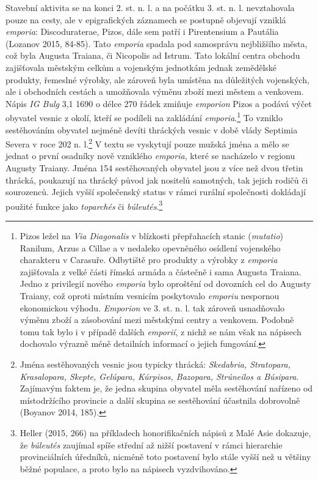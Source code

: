 Stavební aktivita se na konci 2. st. n. l. a na počátku 3. st. n. l. nevztahovala pouze na cesty, ale v epigrafických záznamech se postupně objevují vzniklá {\em emporia}: Discoduraterae, Pizos, dále sem patří i Pirentensium a Pautália (Lozanov 2015, 84-85). Tato {\em emporia} spadala pod samosprávu nejbližšího města, což byla Augusta Traiana, či Nicopolis ad Istrum. Tato lokální centra obchodu zajišťovala městským celkům a vojenským jednotkám jednak zemědělské produkty, řemeslné výrobky, ale zároveň byla umístěna na důležitých vojenských, ale i obchodních cestách a umožňovala výměnu zboží mezi městem a venkovem. Nápis {\em IG Bulg} 3,1 1690 o délce 270 řádek zmiňuje {\em emporion} Pizos a podává výčet obyvatel vesnic z okolí, kteří se podíleli na zakládání {\em emporia}.\footnote{Pizos ležel na {\em Via Diagonalis} v blízkosti přepřahacích stanic ({\em mutatio}) Ranilum, Arzus a Cillae a v nedaleko opevněného osídlení vojenského charakteru v Carasuře. Odbytiště pro produkty a výrobky z {\em emporia} zajišťovala z velké části římská armáda a částečně i sama Augusta Traiana. Jedno z privilegií nového {\em emporia} bylo oproštění od dovozních cel do Augusty Traiany, což oproti místním vesnicím poskytovalo {\em emporiu} nespornou ekonomickou výhodu. {\em Emporion} ve 3. st. n. l. tak zároveň usnadňovalo výměnu zboží a zásobování mezi městskými centry a venkovem. Podobně tomu tak bylo i v případě dalších {\em emporií}, z nichž se nám však na nápisech dochovalo výrazně méně detailních informací o jejich fungování.} To vzniklo sestěhováním obyvatel nejméně devíti thráckých vesnic v době vlády Septimia Severa v roce 202 n. l.\footnote{Jména sestěhovaných vesnic jsou typicky thrácká: {\em Skedabria, Stratopara, Krasalopara, Skepte, Gelúpara, Kúrpisos, Bazopara, Strúneilos a Búsipara}. Zajímavým faktem je, že jedna skupina obyvatel měla sestěhování nařízeno od místodržícího provincie a další skupina se sestěhování účastnila dobrovolně (Boyanov 2014, 185).} V textu se vyskytují pouze mužská jména a mělo se jednat o první osadníky nově vzniklého {\em emporia}, které se nacházelo v regionu Augusty Traiany. Jména 154 sestěhovaných obyvatel jsou z více než dvou třetin thrácká, poukazují na thrácký původ jak nositelů samotných, tak jejich rodičů či sourozenců. Jejich vyšší společenský status v rámci rurální společnosti dokládají použité funkce jako {\em toparchés} či {\em búleutés}.\footnote{Heller (2015, 266) na příkladech honorifikačních nápisů z Malé Asie dokazuje, že {\em búleutés} zaujímal spíše střední až nižší postavení v rámci hierarchie provinciálních úředníků, nicméně toto postavení bylo stále vyšší než u většiny běžné populace, a proto bylo na nápisech vyzdvihováno.}

